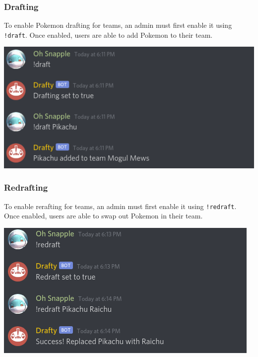 \documentclass{article}
\begin{document}
\subsubsection*{Drafting}
To enable Pokemon drafting for teams, an admin must first enable it using \verb|!draft|. 
Once enabled, users are able to add Pokemon to their team.\\
\begin{center}
  \includegraphics[scale=.5]{draft.png}
\end{center}

\subsubsection*{Redrafting}
To enable rerafting for teams, an admin must first enable it using \verb|!redraft|. 
Once enabled, users are able to swap out Pokemon in their team.\\
\begin{center}
  \includegraphics[scale=.5]{redraft.png}
\end{center}
\end{document}
